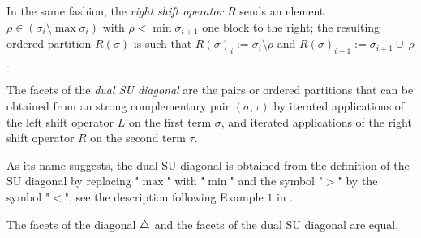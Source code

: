In the same fashion, the \emph{right shift operator} $R$ sends an element $\rho \in (\sigma_{i} \setminus \max\sigma_{i})$ with $\rho < \min \sigma_{i+1}$ one block to the right; the resulting ordered partition $R(\sigma)$ is such that $R(\sigma)_i := \sigma_i \setminus \rho$ and $R(\sigma)_{i+1} := \sigma_{i+1} \cup \ \rho$.

\begin{definition}
    The facets of the \emph{dual SU diagonal} are the pairs or ordered partitions that can be obtained from an strong complementary pair $(\sigma,\tau)$ by iterated applications of the left shift operator $L$ on the first term $\sigma$, and iterated applications of the right shift operator $R$ on the second term $\tau$. 
\end{definition}

As its name suggests, the dual SU diagonal is obtained from the definition of the SU diagonal \cite{SaneblidzeUmble04} by replacing "$\max$" with "$\min$" and the symbol "$>$" by the symbol "$<$", see the description following Example $1$ in \cite{saneblidzeComparingDiagonalsAssociahedra2022}.

\begin{thm}
\label{t:iso-with-SU}
    The facets of the diagonal $\triangle$ and the facets of the dual SU diagonal are equal. 
\end{thm}


